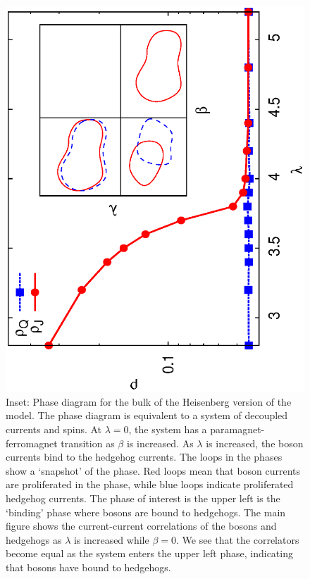 \documentclass[prb,twocolumn]{revtex4-1}
\begin{document}
\begin{figure}
\includegraphics[angle=-90,width=0.9\linewidth]{figures/heisbulkout.eps}
\caption{Inset: Phase diagram for the bulk of the Heisenberg version of the model. The phase diagram is equivalent to a system of decoupled currents and spins. At $\lambda=0$, the system has a paramagnet-ferromagnet transition as $\beta$ is increased. As $\lambda$ is increased, the boson currents bind to the hedgehog currents. The loops in the phases show a `snapshot' of the phase. Red loops mean that boson currents are proliferated in the phase, while blue loops indicate proliferated hedgehog currents. The phase of interest is the upper left is the `binding' phase where bosons are bound to hedgehogs. The main figure shows the current-current correlations of the bosons and hedgehogs as $\lambda$ is increased while $\beta=0$. We see that the correlators become equal as the system enters the upper left phase, indicating that bosons have bound to hedgehogs.}
\label{heisbulk}
\end{figure}
\end{document}

